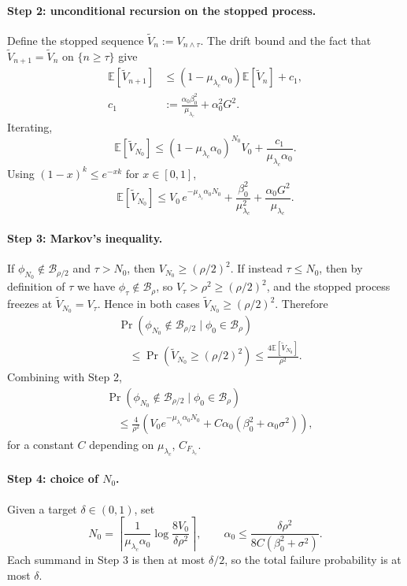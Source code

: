 \documentclass{nextgame2026} %
\newcommand{\E}{\mathbb{E}}
\newcommand{\B}{\mathcal{B}}
\begin{document}
\paragraph{Step 2: unconditional recursion on the stopped process.}
Define the stopped sequence $\tilde V_n:=V_{n\wedge\tau}$. The drift bound and the fact that $\tilde V_{n+1}=\tilde V_n$ on $\{n\ge\tau\}$ give
\[
\begin{aligned}
\E[\tilde V_{n+1}]
&\le (1-\mu_{\lambda_c}\alpha_0)\E[\tilde V_n]+c_1,\\
c_1&:=\frac{\alpha_0\beta_0^2}{\mu_{\lambda_c}}+\alpha_0^2G^2.
\end{aligned}
\]
Iterating,
\[
\E[\tilde V_{N_0}]\le (1-\mu_{\lambda_c}\alpha_0)^{N_0}V_0+\frac{c_1}{\mu_{\lambda_c}\alpha_0}.
\]
Using $(1-x)^k\le e^{-xk}$ for $x\in[0,1]$,
\[
\E[\tilde V_{N_0}]\le V_0\,e^{-\mu_{\lambda_c}\alpha_0 N_0}+\frac{\beta_0^2}{\mu_{\lambda_c}^2}+\frac{\alpha_0 G^2}{\mu_{\lambda_c}}.
\]

\paragraph{Step 3: Markov's inequality.}
If $\phi_{N_0}\notin\B_{\rho/2}$ and $\tau>N_0$, then $V_{N_0}\ge(\rho/2)^2$. If instead $\tau\le N_0$, then by definition of $\tau$ we have $\phi_\tau\notin\B_\rho$, so $V_\tau>\rho^2\ge(\rho/2)^2$, and the stopped process freezes at $\tilde V_{N_0}=V_\tau$. Hence in both cases $\tilde V_{N_0}\ge(\rho/2)^2$. Therefore
\[
\begin{aligned}
&\Pr(\phi_{N_0}\notin\B_{\rho/2}\mid \phi_0\in\B_\rho)\\
&\quad\le \Pr(\tilde V_{N_0}\ge (\rho/2)^2)
\le \frac{4\E[\tilde V_{N_0}]}{\rho^2}.
\end{aligned}
\]
Combining with Step 2,
\[
\begin{aligned}
&\Pr(\phi_{N_0}\notin\B_{\rho/2}\mid\phi_0\in\B_\rho)\\
&\quad\le \frac{4}{\rho^2}\!\left(
V_0 e^{-\mu_{\lambda_c}\alpha_0 N_0}
+C\alpha_0(\beta_0^2+\alpha_0\sigma^2)\right),
\end{aligned}
\]
for a constant $C$ depending on $\mu_{\lambda_c}$, $C_{F_{\lambda_c}}$.

\paragraph{Step 4: choice of $N_0$.}
Given a target $\delta\in(0,1)$, set
\[
N_0=\left\lceil\frac{1}{\mu_{\lambda_c}\alpha_0}\log\!\frac{8V_0}{\delta\rho^2}\right\rceil,
\qquad \alpha_0\le \frac{\delta\rho^2}{8C(\beta_0^2+\sigma^2)}.
\]
Each summand in Step 3 is then at most $\delta/2$, so the total failure probability is at most $\delta$.
\end{document}
